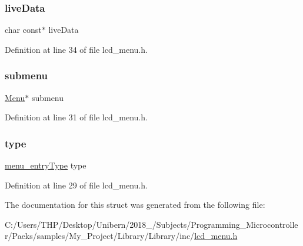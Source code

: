 \subsubsection{\texorpdfstring{live\+Data}{liveData}}
{\footnotesize\ttfamily char const$\ast$ live\+Data}



Definition at line 34 of file lcd\+\_\+menu.\+h.

\mbox{\label{struct_menu_entry___a95d149f99e4a49c9b217e31e0289c696}} 
\subsubsection{\texorpdfstring{submenu}{submenu}}
{\footnotesize\ttfamily \mbox{\hyperlink{lcd__menu_8h_afe0ab1c0311f677767b1588296b0f563}{Menu}}$\ast$ submenu}



Definition at line 31 of file lcd\+\_\+menu.\+h.

\mbox{\label{struct_menu_entry___a9cb8b226841d530cb28f3763c539bf19}} 
\subsubsection{\texorpdfstring{type}{type}}
{\footnotesize\ttfamily \mbox{\hyperlink{lcd__menu_8h_a8803db0b2985fc11bdaaff101b1b999d}{menu\+\_\+entry\+Type}} type}



Definition at line 29 of file lcd\+\_\+menu.\+h.



The documentation for this struct was generated from the following file\+:\begin{DoxyCompactItemize}
\item 
C\+:/\+Users/\+T\+H\+P/\+Desktop/\+Unibern/2018\+\_/\+Subjects/\+Programming\+\_\+\+Microcontroller/\+Paeks/samples/\+My\+\_\+\+Project/\+Library/\+Library/inc/\mbox{\hyperlink{lcd__menu_8h}{lcd\+\_\+menu.\+h}}\end{DoxyCompactItemize}
